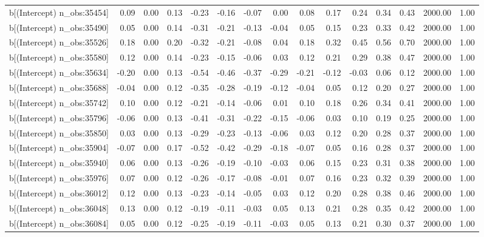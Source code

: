 \begin{table}[ht]
\begin{tabular}{rrrrrrrrrrrrrrr}
  b[(Intercept) n\_obs:35454] & 0.09 & 0.00 & 0.13 & -0.23 & -0.16 & -0.07 & 0.00 & 0.08 & 0.17 & 0.24 & 0.34 & 0.43 & 2000.00 & 1.00 \\ 
  b[(Intercept) n\_obs:35490] & 0.05 & 0.00 & 0.14 & -0.31 & -0.21 & -0.13 & -0.04 & 0.05 & 0.15 & 0.23 & 0.33 & 0.42 & 2000.00 & 1.00 \\ 
  b[(Intercept) n\_obs:35526] & 0.18 & 0.00 & 0.20 & -0.32 & -0.21 & -0.08 & 0.04 & 0.18 & 0.32 & 0.45 & 0.56 & 0.70 & 2000.00 & 1.00 \\ 
  b[(Intercept) n\_obs:35580] & 0.12 & 0.00 & 0.14 & -0.23 & -0.15 & -0.06 & 0.03 & 0.12 & 0.21 & 0.29 & 0.38 & 0.47 & 2000.00 & 1.00 \\ 
  b[(Intercept) n\_obs:35634] & -0.20 & 0.00 & 0.13 & -0.54 & -0.46 & -0.37 & -0.29 & -0.21 & -0.12 & -0.03 & 0.06 & 0.12 & 2000.00 & 1.00 \\ 
  b[(Intercept) n\_obs:35688] & -0.04 & 0.00 & 0.12 & -0.35 & -0.28 & -0.19 & -0.12 & -0.04 & 0.05 & 0.12 & 0.20 & 0.27 & 2000.00 & 1.00 \\ 
  b[(Intercept) n\_obs:35742] & 0.10 & 0.00 & 0.12 & -0.21 & -0.14 & -0.06 & 0.01 & 0.10 & 0.18 & 0.26 & 0.34 & 0.41 & 2000.00 & 1.00 \\ 
  b[(Intercept) n\_obs:35796] & -0.06 & 0.00 & 0.13 & -0.41 & -0.31 & -0.22 & -0.15 & -0.06 & 0.03 & 0.10 & 0.19 & 0.25 & 2000.00 & 1.00 \\ 
  b[(Intercept) n\_obs:35850] & 0.03 & 0.00 & 0.13 & -0.29 & -0.23 & -0.13 & -0.06 & 0.03 & 0.12 & 0.20 & 0.28 & 0.37 & 2000.00 & 1.00 \\ 
  b[(Intercept) n\_obs:35904] & -0.07 & 0.00 & 0.17 & -0.52 & -0.42 & -0.29 & -0.18 & -0.07 & 0.05 & 0.16 & 0.28 & 0.37 & 2000.00 & 1.00 \\ 
  b[(Intercept) n\_obs:35940] & 0.06 & 0.00 & 0.13 & -0.26 & -0.19 & -0.10 & -0.03 & 0.06 & 0.15 & 0.23 & 0.31 & 0.38 & 2000.00 & 1.00 \\ 
  b[(Intercept) n\_obs:35976] & 0.07 & 0.00 & 0.12 & -0.26 & -0.17 & -0.08 & -0.01 & 0.07 & 0.16 & 0.23 & 0.32 & 0.39 & 2000.00 & 1.00 \\ 
  b[(Intercept) n\_obs:36012] & 0.12 & 0.00 & 0.13 & -0.23 & -0.14 & -0.05 & 0.03 & 0.12 & 0.20 & 0.28 & 0.38 & 0.46 & 2000.00 & 1.00 \\ 
  b[(Intercept) n\_obs:36048] & 0.13 & 0.00 & 0.12 & -0.19 & -0.11 & -0.03 & 0.05 & 0.13 & 0.21 & 0.28 & 0.35 & 0.42 & 2000.00 & 1.00 \\ 
  b[(Intercept) n\_obs:36084] & 0.05 & 0.00 & 0.12 & -0.25 & -0.19 & -0.11 & -0.03 & 0.05 & 0.13 & 0.21 & 0.30 & 0.37 & 2000.00 & 1.00 \\ 

\end{tabular}
\end{table}
